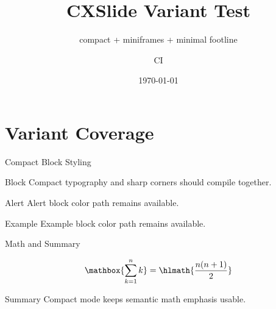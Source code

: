 \documentclass[aspectratio=169, UTF8]{ctexbeamer}
\title{CXSlide Variant Test}
\subtitle{compact + miniframes + minimal footline}
\author{CI}
\date{\today}
\begin{document}
\begin{frame}
  \titlepage
\end{frame}

\section{Variant Coverage}

\begin{frame}{Compact Block Styling}
  \begin{block}{Block}
    Compact typography and sharp corners should compile together.
  \end{block}
  \begin{alertblock}{Alert}
    Alert block color path remains available.
  \end{alertblock}
  \begin{exampleblock}{Example}
    Example block color path remains available.
  \end{exampleblock}
\end{frame}

\begin{frame}{Math and Summary}
  \begin{smallmath}
    \[
      \mathbox{\sum_{k=1}^{n} k} = \hlmath{\frac{n(n+1)}{2}}
    \]
  \end{smallmath}
  \begin{block}{Summary}
    Compact mode keeps semantic math emphasis usable.
  \end{block}
\end{frame}
\end{document}
